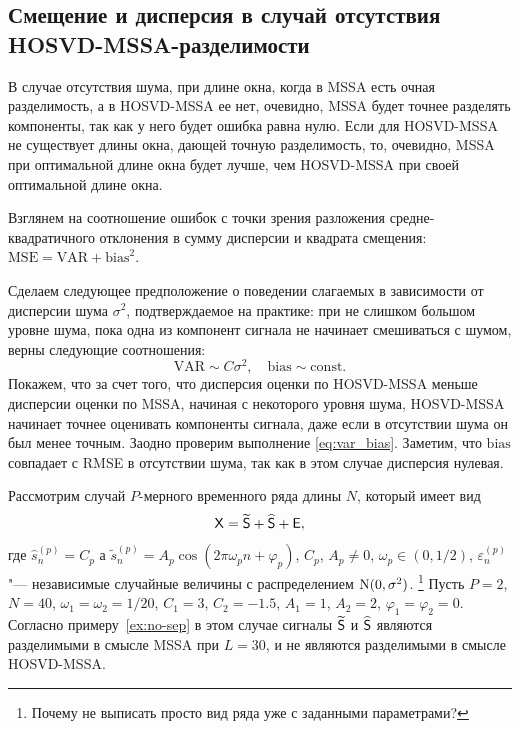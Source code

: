 \documentclass[specialist,
    substylefile = spbu.rtx,
    subf,href,colorlinks=true, 12pt]{disser}
\theoremstyle{plain}
\theoremstyle{definition}
\theoremstyle{remark}
\begin{document}
    \subsection{Смещение и дисперсия в случай отсутствия HOSVD-MSSA-разделимости}
    
    В случае отсутствия шума, при длине окна, когда в MSSA есть очная разделимость, а в HOSVD-MSSA ее нет, очевидно, MSSA будет точнее разделять компоненты, так как у него будет ошибка равна нулю. Если для HOSVD-MSSA не существует длины окна, дающей точную разделимость, то, очевидно, MSSA при оптимальной длине окна будет лучше, чем HOSVD-MSSA при своей оптимальной длине окна. 
    
    Взглянем на соотношение ошибок с точки зрения разложения средне-квадратичного отклонения в сумму дисперсии и квадрата смещения: $\mathrm{MSE} = \mathrm{VAR} + \mathrm{bias}^2$.
    
    Сделаем следующее предположение о поведении слагаемых в зависимости от дисперсии шума $\sigma^2$, подтверждаемое на практике: при не слишком большом уровне шума, пока одна из компонент сигнала не начинает смешиваться с шумом, верны следующие соотношения:
    \begin{equation}
    \label{eq:var_bias}
    \mathrm{VAR} \sim C\sigma^2, \quad \mathrm{bias} \sim \mathrm{const}.
    \end{equation} 
    Покажем, что за счет того, что дисперсия оценки по HOSVD-MSSA меньше дисперсии оценки по MSSA, начиная с некоторого уровня шума, HOSVD-MSSA начинает точнее оценивать компоненты сигнала, даже если в отсутствии шума он был менее точным. Заодно проверим выполнение  \eqref{eq:var_bias}. Заметим, что $\mathrm{bias}$ совпадает с RMSE в отсутствии шума, так как в этом случае дисперсия нулевая.
    
    Рассмотрим случай $P$-мерного временного ряда длины $N$, который имеет вид
    \[
        \mathsf{X} = \widetilde{\mathsf{S}} + \widehat{\mathsf{S}} + \mathsf{E},
    \]
    где $\hat{s}_n^{(p)} = C_p$ а
    $\tilde{s}_n^{(p)} = A_p \cos(2\pi \omega_p n + \varphi_p)$,
    $C_p$, $A_p \ne 0$, $\omega_p \in (0, 1/2)$, $\varepsilon_n^{(p)}$ "--- независимые случайные величины
    с распределением $\mathrm{N}(0, \sigma^2)$. \footnote{Почему не выписать просто вид ряда уже с заданными параметрами?}
    Пусть $P=2$, $N=40$, $\omega_1=\omega_2=1/20$, $C_1 = 3$, $C_2=-1.5$, $A_1 = 1$, $A_2 = 2$,
    $\varphi_1 = \varphi_2 = 0$.
    Согласно примеру~\ref{ex:no-sep} в этом случае сигналы $\widetilde{\mathsf{S}}$ и $\widehat{\mathsf{S}}$ являются
    разделимыми в смысле MSSA при $L=30$, и не являются разделимыми в смысле HOSVD-MSSA.
\end{document}
